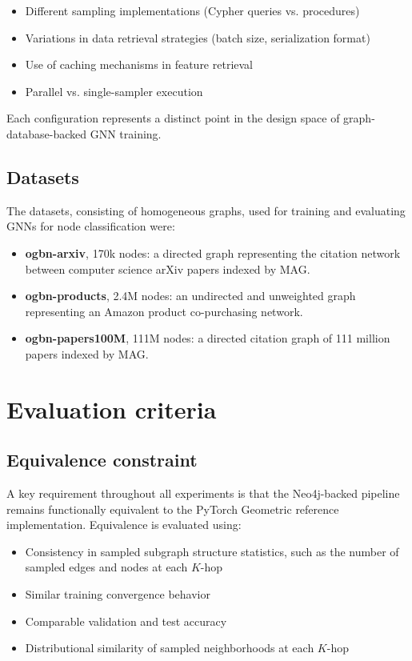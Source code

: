 \documentclass[PhD]{uclathes}
\begin{document}
\begin{itemize}
    \item Different sampling implementations (Cypher queries vs. procedures)
    \item Variations in data retrieval strategies (batch size, serialization format)
    \item Use of caching mechanisms in feature retrieval
    \item Parallel vs. single-sampler execution
\end{itemize}

Each configuration represents a distinct point in the design space of
graph-database-backed GNN training.

\subsection{Datasets}
The datasets, consisting of homogeneous graphs, used for training and
evaluating GNNs for node classification were:

\begin{itemize}
    \item \textbf{ogbn-arxiv}, 170k nodes: a directed graph representing the citation network between computer science arXiv papers indexed by MAG.
    \item \textbf{ogbn-products}, 2.4M nodes: an undirected and unweighted graph representing an Amazon product co-purchasing network.
    \item \textbf{ogbn-papers100M}, 111M nodes: a directed citation graph of 111 million papers indexed by MAG.
\end{itemize}

\section{Evaluation criteria}
\subsection{Equivalence constraint}
A key requirement throughout all experiments is that the Neo4j-backed pipeline
remains functionally equivalent to the PyTorch Geometric reference
implementation. Equivalence is evaluated using:

\begin{itemize}
    \item Consistency in sampled subgraph structure statistics, such as the number of sampled edges and nodes at each $K$-hop
    \item Similar training convergence behavior
    \item Comparable validation and test accuracy
    \item Distributional similarity of sampled neighborhoods at each $K$-hop
\end{itemize}
\end{document}
